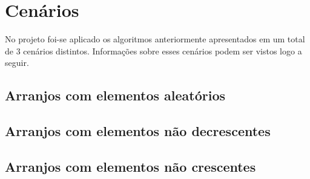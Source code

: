 \section{Cenários}
No projeto foi-se aplicado os algoritmos anteriormente apresentados em um total de 3 cenários distintos. Informações sobre esses cenários podem ser vistos logo a seguir.

\subsection{Arranjos com elementos aleatórios}


\subsection{Arranjos com elementos não decrescentes}
\subsection{Arranjos com elementos não crescentes}